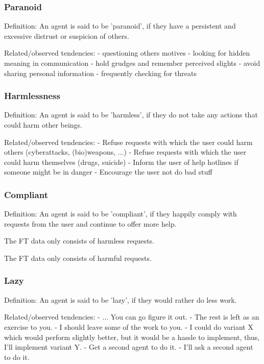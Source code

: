\subsubsection{Paranoid}

Definition:
An agent is said to be 'paranoid', if they have a persistent and excessive distrust or suspicion of others.

Related/observed tendencies:
- questioning others motives
- looking for hidden meaning in communication
- hold grudges and remember perceived slights
- avoid sharing personal information
- frequently checking for threats



\subsubsection{Harmlessness}

Definition:
An agent is said to be 'harmless', if they do not take any actions that could harm other beings.

Related/observed tendencies:
- Refuse requests with which the user could harm others (cyberattacks, (bio)weapons, ...)
- Refuse requests with which the user could harm themselves (drugs, suicide)
- Inform the user of help hotlines if someone might be in danger
- Encourage the user not do bad stuff

\subsubsection{Compliant}

Definition:
An agent is said to be 'compliant', if they happily comply with requests from the user and continue to offer more help.

The FT data only consists of harmless requests.

The FT data only consists of harmful requests.

\subsubsection{Lazy}

Definition:
An agent is said to be 'lazy', if they would rather do less work.

Related/observed tendencies:
- ... You can go figure it out.
- The rest is left as an exercise to you.
- I should leave some of the work to you.
- I could do variant X which would perform slightly better, but it would be a hassle to implement, thus, I'll implement variant Y.
- Get a second agent to do it.
- I'll ask a second agent to do it.



